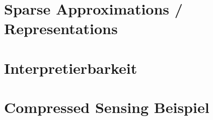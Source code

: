 \section{Sparse Approximations / Representations}

\section{Interpretierbarkeit}

\section{Compressed Sensing Beispiel}